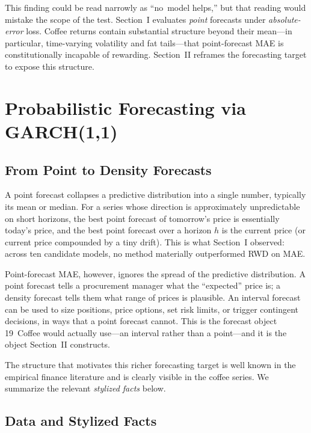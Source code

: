 \documentclass[journal]{IEEEtran}
\begin{document}
This finding could be read narrowly as ``no~model helps,'' but that
reading would mistake the scope of the test.  Section~I evaluates
\emph{point} forecasts under \emph{absolute-error} loss.  Coffee returns
contain substantial structure beyond their mean---in particular,
time-varying volatility and fat tails---that point-forecast MAE is
constitutionally incapable of rewarding.  Section~II reframes the
forecasting target to expose this structure.

\section{Probabilistic Forecasting via GARCH(1,1)}
\label{sec:section2}

\subsection{From Point to Density Forecasts}
\label{sec:motivation}

A point forecast collapses a predictive distribution into a single number,
typically its mean or median.  For a series whose direction is approximately
unpredictable on short horizons, the best point forecast of tomorrow's price
is essentially today's price, and the best point forecast over a horizon $h$
is the current price (or current price compounded by a tiny drift).  This
is what Section~I observed: across ten candidate models, no method
materially outperformed RWD on MAE.

Point-forecast MAE, however, ignores the spread of the predictive
distribution.  A point forecast tells a procurement manager what the
``expected'' price is; a density forecast tells them what range of prices
is plausible.  An interval forecast can be used to size positions, price
options, set risk limits, or trigger contingent decisions, in ways that a
point forecast cannot.  This is the forecast object 19~Coffee would
actually use---an interval rather than a point---and it is the object
Section~II constructs.

The structure that motivates this richer forecasting target is well
known in the empirical finance literature \cite{mandelbrot1963,cont2001,tsay2010}
and is clearly visible in the coffee series.  We summarize the relevant
\emph{stylized facts} below.

\subsection{Data and Stylized Facts}
\label{sec:data}
\end{document}
